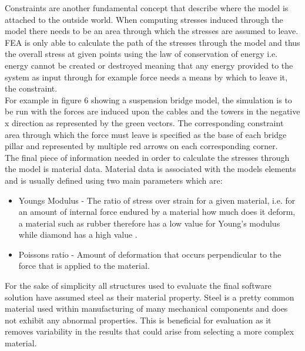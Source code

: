 
\noindent
Constraints are another fundamental concept that describe where the model is attached to the outside world. When computing stresses induced through the model there needs to be an area through which the stresses are assumed to leave. FEA is only able to calculate the path of the stresses through the model and thus the overall stress at given points using the law of conservation of energy i.e. energy cannot be created or destroyed meaning that any energy provided to the system as input through for example force needs a means by which to leave it, the constraint. \\

\noindent
For example in figure 6 showing a suspension bridge model, the simulation is to be run with the forces are induced upon the cables and the towers in the negative x direction as represented by the green vectors. The corresponding constraint area through which the force must leave is specified as the base of each bridge pillar and represented by multiple red arrows on each corresponding corner.\\

\noindent
The final piece of information needed in order to calculate the stresses through the model is material data. Material data is associated with the models elements and is usually defined using two main parameters which are:

\begin{itemize}
\item Youngs Modulus - The ratio of stress over strain for a given material, i.e. for an amount of internal force endured by a material how much does it deform, a material such as rubber therefore has a low value for Young's modulus while diamond has a high value \cite{YoungsModulus}.

\item Poissons ratio - Amount of deformation that occurs perpendicular to the force that is applied to the material.
\end{itemize}

\noindent
For the sake of simplicity all structures used to evaluate the final software solution have assumed steel as their material property. Steel is a pretty common material used within manufacturing of many mechanical components and does not exhibit any abnormal properties. This is beneficial for evaluation as it removes variability in the results that could arise from selecting a more complex material.

